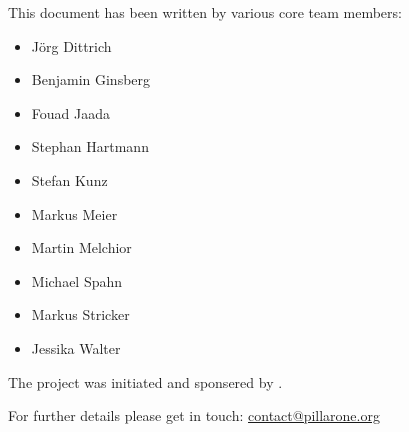 \begin{titlepage}
\begin{flushleft}
{{This document has been written by various \PO{} core team members:
\begin{itemize}\tightitemize{0pt}
	\item J\"org Dittrich
	\item Benjamin Ginsberg
	\item Fouad Jaada
	\item Stephan Hartmann
	\item Stefan Kunz
	\item Markus Meier
	\item	Martin Melchior
	\item Michael Spahn
	\item Markus Stricker
	\item Jessika Walter
\end{itemize}
\vspace*{1cm}

The \PO{} project was initiated and sponsered by \MR.
}}

\vspace*{1cm}

For further details please get in touch: \href{mailto:contact@pillarone.org}{contact@pillarone.org}

\end{flushleft}
\end{titlepage}




